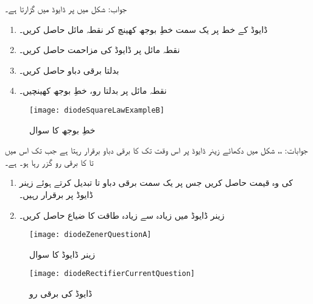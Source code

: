 جواب: 
شکل  میں  پر ڈایوڈ میں  گزارتا ہے۔
\begin{enumerate}
\item
ڈایوڈ کے خط پر یک سمت خطِ بوجھ کھینچ کر نقطہ مائل حاصل کریں۔
\item
نقطہ مائل پر ڈایوڈ کی مزاحمت  حاصل کریں۔
\item
بدلتا برقی دباو  حاصل کریں۔
\item
نقطہ مائل پر بدلتا رو، خطِ بوجھ کھینچیں۔
\end{enumerate}
\begin{figure}
\centering
\texttt{[image: diodeSquareLawExampleB]}
\caption{خطِ بوجھ کا سوال}
\label{شکل_ڈایوڈ_بار_کے_خط}
\end{figure}

جوابات: ،،  
شکل  میں دکھائے زینر ڈایوڈ پر اس وقت تک  کا برقی دباو برقرار رہتا ہے  جب تک اس میں  تا  کا برقی رو گزر رہا ہو۔ ہے۔
\begin{enumerate}
\item
{} کی وہ قیمت حاصل کریں جس پر یک سمت برقی دباو  تا  تبدیل کرتے ہوئے  زینر ڈایوڈ پر  برقرار رہیں۔
\item
زینر ڈایوڈ میں زیادہ سے زیادہ طاقت کا ضیاع حاصل کریں۔
\end{enumerate}
%
\begin{figure}
\centering
\texttt{[image: diodeZenerQuestionA]}
\caption{زینر ڈایوڈ کا سوال}
\label{شکل_زینر_ڈایوڈ_سوال_الف}
\end{figure}
%
\begin{figure}
\centering
\texttt{[image: diodeRectifierCurrentQuestion]}
\caption{ڈایوڈ کی برقی رو}
\label{شکل_ڈایوڈ_برقی_رو}
\end{figure}

